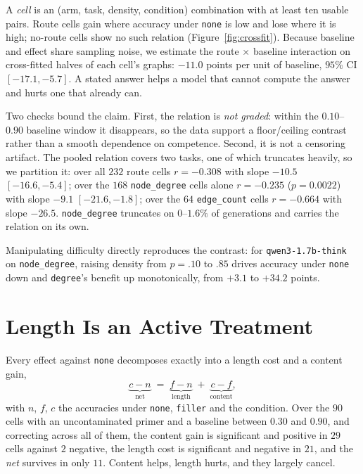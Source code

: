 \documentclass[11pt]{article}
\begin{document}
A \emph{cell} is an (arm, task, density, condition) combination with at least
ten usable pairs. Route cells gain where accuracy under \texttt{none} is low
and lose where it is high; no-route cells show no such relation
(Figure~\ref{fig:crossfit}). Because baseline and effect share sampling noise,
we estimate the route $\times$ baseline interaction on cross-fitted halves of
each cell's graphs: $-11.0$ points per unit of baseline, $95\%$ CI
$[-17.1, -5.7]$. A stated answer helps a model that cannot compute the answer
and hurts one that already can.

Two checks bound the claim. First, the relation is \emph{not graded}: within
the $0.10$--$0.90$ baseline window it disappears, so the data support a
floor/ceiling contrast rather than a smooth dependence on competence. Second,
it is not a censoring artifact. The pooled relation covers two tasks, one of
which truncates heavily, so we partition it: over all $232$ route cells
$r{=}-0.308$ with slope $-10.5$ $[-16.6, -5.4]$; over the $168$
\texttt{node\_degree} cells alone $r{=}-0.235$ ($p{=}0.0022$) with slope $-9.1$
$[-21.6, -1.8]$; over the $64$ \texttt{edge\_count} cells $r{=}-0.664$ with
slope $-26.5$. \texttt{node\_degree} truncates on $0$--$1.6\%$ of generations
and carries the relation on its own.

Manipulating difficulty directly reproduces the contrast: for
\texttt{qwen3-1.7b-think} on \texttt{node\_degree}, raising density from
$p{=}.10$ to $.85$ drives accuracy under \texttt{none} down and
\texttt{degree}'s benefit up monotonically, from $+3.1$ to $+34.2$ points.

\section{Length Is an Active Treatment}
\label{sec:length}

Every effect against \texttt{none} decomposes exactly into a length cost and a
content gain,
\[
\underbrace{c - n}_{\text{net}} \;=\;
\underbrace{f - n}_{\text{length}} \;+\;
\underbrace{c - f}_{\text{content}},
\]
with $n$, $f$, $c$ the accuracies under \texttt{none}, \texttt{filler} and the
condition. Over the $90$ cells with an uncontaminated primer and a baseline
between $0.30$ and $0.90$, and correcting across all of them, the content gain
is significant and positive in $29$ cells against $2$ negative, the length cost
is significant and negative in $21$, and the \emph{net} survives in only $11$.
Content helps, length hurts, and they largely cancel.
\end{document}
